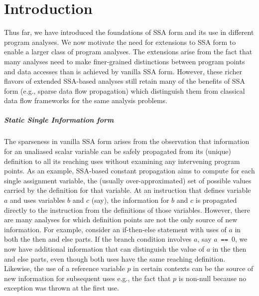 \chapter{Introduction }


Thus far, we have introduced the foundations of SSA form and its use in different program analyses.  We now motivate the need for extensions to SSA form to enable a larger class of program analyses.  The extensions arise from the fact that many analyses need to make finer-grained distinctions between program points and data accesses than is achieved by vanilla SSA form.  However, these richer flavors of extended SSA-based analyses still retain many of the benefits of SSA form (e.g., sparse data flow propagation)  which distinguish them from classical data flow frameworks for the same analysis problems.


\paragraph{Static Single Information form}

The sparseness in vanilla SSA form arises from the observation that information for an unaliased scalar variable can be safely propagated from its (unique) definition to all its reaching uses without examining any intervening program points.  As an example, SSA-based constant propagation aims to compute for each single assignment variable, the (usually over-approximated) set of possible values carried by the definition for that variable. At an instruction that defines variable $a$ and uses variables $b$ and $c$ (say), the information for $b$ and $c$ is propagated directly to the instruction from the definitions of those variables.  However, there are many analyses for which definition points are not the only source of new information. For example, consider an if-then-else statement with uses of $a$ in both the then and else parts.  If the branch condition involves $a$, say $a$~{\tt ==}~0, we now have additional information that can distinguish the value of $a$ in the then and else parts, even though both uses have the same reaching definition.  Likewise, the use of a reference  variable $p$ in certain contexts can be the source of new information for subsequent uses e.g., the fact that $p$ is non-null because no exception was thrown at the first use.

